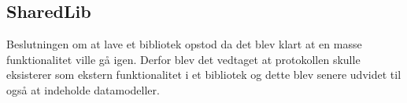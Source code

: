 \subsection{SharedLib}
Beslutningen om at lave et bibliotek opstod da det blev klart at en masse funktionalitet ville gå igen. Derfor blev det vedtaget at protokollen skulle eksisterer som ekstern funktionalitet i et bibliotek og dette blev senere udvidet til også at indeholde datamodeller.


